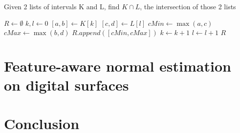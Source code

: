 \documentclass[runningheads]{llncs}
\begin{document}
    \begin{algorithm}
        \caption{Given 2 lists of intervals K and L, find $K \cap L$, the intersection of those 2 lists}
        \label{alg:intersection}
        \begin{algorithmic}
                \State $R \gets \emptyset$
                \State $k, l \gets 0$
                    \State $[a,b] \gets K[k]$
                    \State $[c,d] \gets L[l]$
                    \State $cMin \gets \max(a, c)$
                    \State $cMax \gets \max(b, d)$
                        \State $R.append([cMin, cMax])$
                    \EndIf
                        \State $k \gets k+1$
                    \EndIf
                        \State $l \gets l+1$
                    \EndIf
                \EndWhile
                \State \Return $R$
            \EndFunction
        \end{algorithmic}
    \end{algorithm}



    \section{Feature-aware normal estimation on digital surfaces}



    \section{Conclusion}
\end{document}
